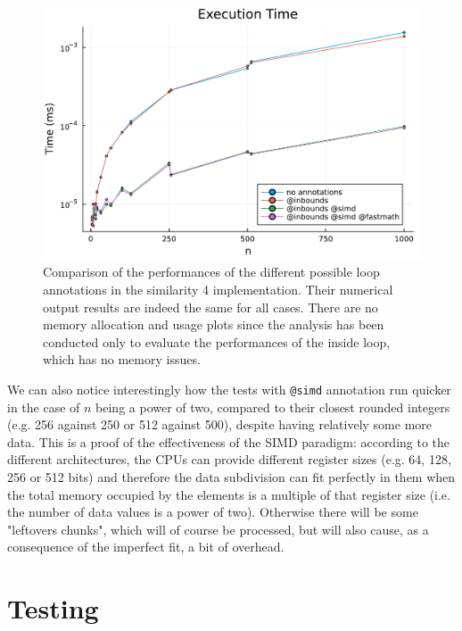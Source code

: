\documentclass[12pt,	%
	a4paper,		%
	twoside,		%
	openright,		%
	titlepage,%
	]{book}
\theoremstyle{definition}
\newcommand{\mjline}[1]{\texttt{#1}}
\begin{document}
\begin{figure}[h]
    \centering
    \includegraphics[width=1\linewidth]{Plots/execution_time_tests_sims_pow2.pdf}
    \caption[Similarity 4 annotations comparison]{Comparison of the performances of the different possible loop annotations in the similarity 4 implementation. Their numerical output results are indeed the same for all cases. There are no memory allocation and usage plots since the analysis has been conducted only to evaluate the performances of the inside loop, which has no memory issues.}
    \label{fig: exec time sim}
\end{figure}

We can also notice interestingly how the tests with \mjline{@simd} annotation run quicker in the case of $n$ being a power of two, compared to their closest rounded integers (e.g. 256 against 250 or 512 against 500), despite having relatively some more data. This is a proof of the effectiveness of the SIMD paradigm: according to the different architectures, the CPUs can provide different register sizes (e.g. 64, 128, 256 or 512 bits) and therefore the data subdivision can fit perfectly in them when the total memory occupied by the elements is a multiple of that register size (i.e. the number of data values is a power of two). Otherwise there will be some "leftovers chunks", which will of course be processed, but will also cause, as a consequence of the imperfect fit, a bit of overhead.





\chapter{Testing}
\label{chap: testing}
\end{document}
